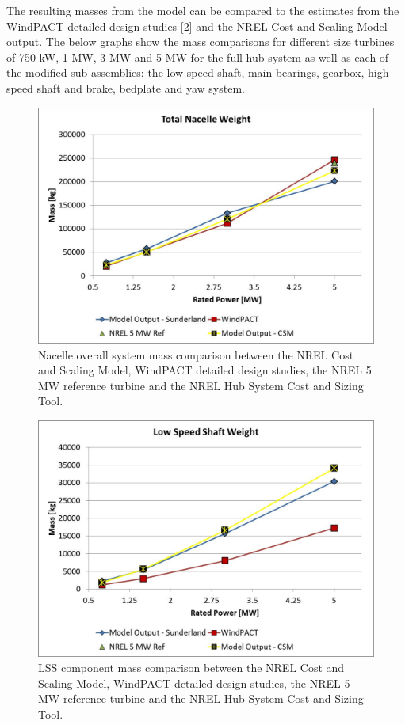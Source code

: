 \documentclass[letterpaper,10pt,openany,oneside]{sphinxmanual}
\begin{document}
The resulting masses from the model can be compared to the estimates from the WindPACT detailed design studies {\hyperref[theory:2]{{[}2{]}}} and the NREL Cost and Scaling Model output.  The below graphs show the mass comparisons for different size turbines of 750 kW, 1 MW, 3 MW and 5 MW for the full hub system as well as each of the modified sub-assemblies: the low-speed shaft, main bearings, gearbox, high-speed shaft and brake, bedplate and yaw system.
\begin{figure}[htbp]
\centering
\capstart

\includegraphics[width=6.5in]{nacellemass.pdf}
\caption{Nacelle overall system mass comparison between the NREL Cost and Scaling Model, WindPACT detailed design studies, the NREL 5 MW reference turbine and the NREL Hub System Cost and Sizing Tool.}\label{theory:nacellemass}\end{figure}
\begin{figure}[htbp]
\centering
\capstart

\includegraphics[width=6.5in]{lssmass.pdf}
\caption{LSS component mass comparison between the NREL Cost and Scaling Model, WindPACT detailed design studies, the NREL 5 MW reference turbine and the NREL Hub System Cost and Sizing Tool.}\label{theory:lssmass}\end{figure}
\end{document}
